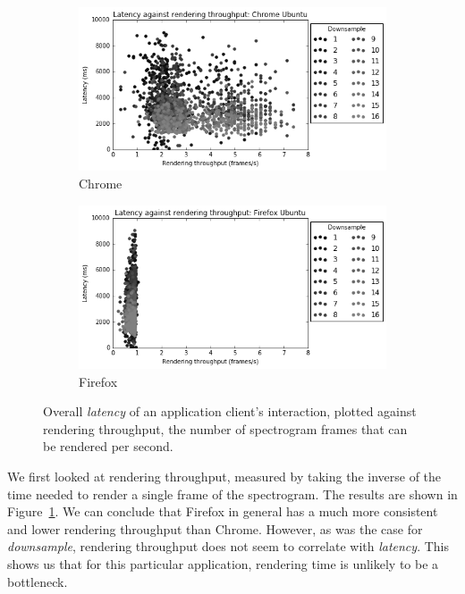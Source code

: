  \begin{figure}[h]
  \begin{center}
  \begin{subfigure}{0.49\textwidth}
    \includegraphics[width=\textwidth]{./img/chrome-fps.png}
    \caption{Chrome}
  \end{subfigure}
  \begin{subfigure}{0.49\textwidth}
    \includegraphics[width=\textwidth]{./img/firefox-fps.png}
    \caption{Firefox}
  \end{subfigure}
  \caption{Overall \emph{latency} of an application client's interaction,
      plotted against rendering throughput, the number of spectrogram frames
      that can be rendered per second.}
  \label{fig:fps}
  \end{center}
  \end{figure}

We first looked at rendering throughput, measured by taking the inverse of the
time needed to render a single frame of the spectrogram. The results are shown
in Figure~\ref{fig:fps}. We can conclude that Firefox in general has a much
more consistent and lower rendering throughput than Chrome.  However, as was
the case for \emph{downsample}, rendering throughput does not seem to correlate
with \emph{latency}. This shows us that for this particular application,
rendering time is unlikely to be a bottleneck.\\


